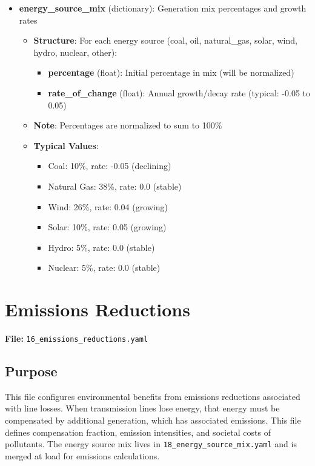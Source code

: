 \documentclass[ctcc_full_documentation.tex]{subfiles}
\begin{document}
\begin{itemize}
    \item \textbf{energy\_source\_mix} (dictionary): Generation mix percentages and growth rates
    \begin{itemize}
        \item \textbf{Structure}: For each energy source (coal, oil, natural\_gas, solar, wind, hydro, nuclear, other):
        \begin{itemize}
            \item \textbf{percentage} (float): Initial percentage in mix (will be normalized)
            \item \textbf{rate\_of\_change} (float): Annual growth/decay rate (typical: -0.05 to 0.05)
        \end{itemize}
        \item \textbf{Note}: Percentages are normalized to sum to 100\%
        \item \textbf{Typical Values}:
        \begin{itemize}
            \item Coal: 10\%, rate: -0.05 (declining)
            \item Natural Gas: 38\%, rate: 0.0 (stable)
            \item Wind: 26\%, rate: 0.04 (growing)
            \item Solar: 10\%, rate: 0.05 (growing)
            \item Hydro: 5\%, rate: 0.0 (stable)
            \item Nuclear: 5\%, rate: 0.0 (stable)
        \end{itemize}
    \end{itemize}
\end{itemize}

\section{Emissions Reductions}
\label{sec:emissions}

\textbf{File:} \texttt{16\_emissions\_reductions.yaml}

\subsection{Purpose}

This file configures environmental benefits from emissions reductions associated with line losses. When transmission lines lose energy, that energy must be compensated by additional generation, which has associated emissions. This file defines compensation fraction, emission intensities, and societal costs of pollutants. The energy source mix lives in \texttt{18\_energy\_source\_mix.yaml} and is merged at load for emissions calculations.
\end{document}
